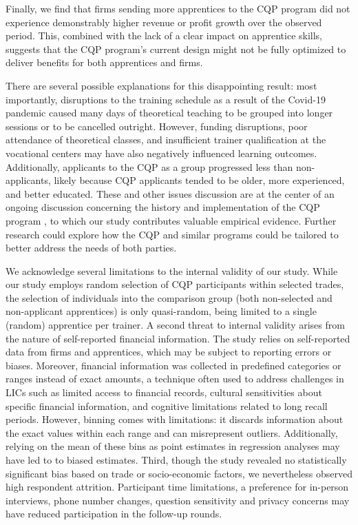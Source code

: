 \documentclass[
  a4paper, twoside, 12pt]{book}
\renewcommand{\hl}[1]{#1}
\begin{document}
\hl{Finally, we find that firms sending more apprentices to the CQP program did not experience demonstrably higher revenue or profit growth over the observed period. This, combined with the lack of a clear impact on apprentice skills, suggests that the CQP program's current design might not be fully optimized to deliver benefits for both apprentices and firms.}

There are several possible explanations for this disappointing result: most importantly, disruptions to the training schedule as a result of the Covid-19 pandemic caused many days of theoretical teaching to be grouped into longer sessions or to be cancelled outright. However, funding disruptions, poor attendance of theoretical classes, and insufficient trainer qualification at the vocational centers may have also negatively influenced learning outcomes. Additionally, applicants to the CQP as a group progressed less than non-applicants, likely because CQP applicants tended to be older, more experienced, and better educated. These and other issues discussion are at the center of an ongoing discussion concerning the history and implementation of the CQP program \autocite{davodoun2011,david-gnahoui2017,bankole2020}, to which our study contributes valuable empirical evidence. Further research could explore how the CQP and similar programs could be tailored to better address the needs of both parties.

\hl{We acknowledge several limitations to the internal validity of our study. While our study employs random selection of CQP participants within selected trades, the selection of individuals into the comparison group (both non-selected and non-applicant apprentices) is only quasi-random, being limited to a single (random) apprentice per trainer. A second threat to internal validity arises from the nature of self-reported financial information. The study relies on self-reported data from firms and apprentices, which may be subject to reporting errors or biases. Moreover, financial information was collected in predefined categories or ranges instead of exact amounts, a technique often used to address challenges in LICs such as limited access to financial records, cultural sensitivities about specific financial information, and cognitive limitations related to long recall periods. However, binning comes with limitations: it discards information about the exact values within each range and can misrepresent outliers. Additionally, relying on the mean of these bins as point estimates in regression analyses may have led to to biased estimates. Third, though the study revealed no statistically significant bias based on trade or socio-economic factors, we nevertheless observed high respondent attrition. Participant time limitations, a preference for in-person interviews, phone number changes, question sensitivity and privacy concerns may have reduced participation in the follow-up rounds.} 
\end{document}
